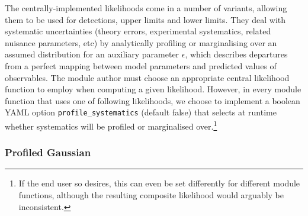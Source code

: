\documentclass[pdftex,twocolumn,epjc3_preprint,runningheads]{svjour3}
\renewcommand{\_}{\discretionary{\underscore}{}{\underscore}}
\newcommand\yaml[1]{{\lstset{style=yaml}\lstinline!#1!\lstset{style=cpp}}}
\newcommand\yamlvalue[1]{{\YAMLvaluestyle\ttfamily#1}}
\newcommand\YAMLvaluestyle{\footnotesize\color{blue}\mdseries}
\newcommand\YAML{\textsf{YAML}\xspace}
\begin{document}
The centrally-implemented likelihoods come in a number of variants, allowing them to be used for detections, upper limits and lower limits.  They deal with systematic uncertainties (theory errors, experimental systematics, related nuisance parameters, etc) by analytically profiling or marginalising over an assumed distribution for an auxiliary parameter $\epsilon$, which describes departures from a perfect mapping between model parameters and predicted values of observables.  The module author must choose an appropriate central likelihood function to employ when computing a given likelihood.  However, in every module function that uses one of following likelihoods, we choose to implement a boolean \YAML option \yaml{profile_systematics} (default \yamlvalue{false}) that selects at runtime whether systematics will be profiled or marginalised over.\footnote{If the end user so desires, this can even be set differently for different module functions, although the resulting composite likelihood would arguably be inconsistent.}

\subsubsection{Profiled Gaussian}
\end{document}
